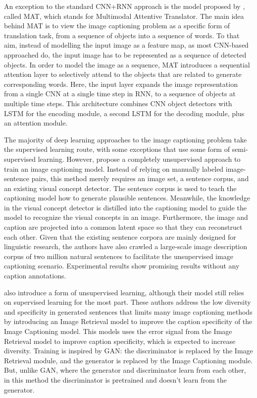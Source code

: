 An exception to the standard CNN+RNN approach is the model proposed by \citet{Liu2017_MAT}, called MAT, which stands for Multimodal Attentive Translator. The main idea behind MAT is to view the image captioning problem as a specific form of translation task, from a sequence of objects into a sequence of words. To that aim, instead of modelling the input image as a feature map, as most CNN-based approached do, the input image has to be represented as a sequence of detected objects. In order to model the image as a sequence, MAT introduces a sequential attention layer to selectively attend to the objects that are related to generate corresponding words. Here, the input layer expands the image representation from a single CNN at a single time step in RNN, to a sequence of objects at multiple time steps. This architecture combines CNN object detectors with LSTM for the encoding module, a second  LSTM for the decoding module, plus an attention module.

The majority of deep learning approaches to the image captioning problem take the supervised learning route, with some exceptions that use some form of semi-supervised learning\citep{Pu2016_VAE, Anderson2018_SemiSup}. However, \citet{Feng2018} propose a completely unsupervised approach to train an image captioning model. Instead of relying on manually labeled image-sentence pairs, this method merely requires an image set, a sentence corpus, and an existing visual concept detector. The sentence corpus is used to teach the captioning model how to generate plausible sentences. Meanwhile, the knowledge in the visual concept detector is distilled into the captioning model to guide the model to recognize the visual concepts in an image. Furthermore, the image and caption are projected into a common latent space so that they can reconstruct each other. Given that the existing sentence corpora are mainly designed for linguistic research, the authors have also  crawled a large-scale image description corpus of two million natural sentences to facilitate the unsupervised image captioning scenario. Experimental results show promising results without any caption annotations.

\citet{Lindh2018} also introduce a form of unsupervised learning, although their model still relies on supervised learning for the most part. These authors address the low diversity and specificity in generated sentences that limits many image captioning methods by  introducing an Image Retrieval model to improve the caption specificity of the Image Captioning model. This models uses the error signal from the Image Retrieval model to improve caption specificity, which is expected to increase diversity. Training is inspired by GAN: the discriminator is replaced by the Image Retrieval module, and the generator is replaced by the Image Captioning module. But, unlike GAN, where the generator and discriminator learn from each other, in this method the discriminator is pretrained and doesn't learn from the generator. 

